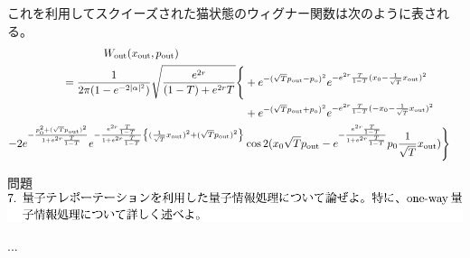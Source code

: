 \documentclass{jsarticle}
\newcommand{\mr}[1]{\mathrm{#1}}
\begin{document}
これを利用してスクイーズされた猫状態のウィグナー関数は次のように表される。
\begin{align*}
	W_\mr{out}(x_\mr{out}, p_\mr{out}) \qquad \qquad \qquad \\
	= \frac{1}{2\pi (1-e^{-2|\alpha|^2})} \sqrt{\frac{e^{2r}}{(1-T) + e^{2r}T}} \Biggl\{
	&+ e^{-(\sqrt{T} p_\mr{out} - p_\mr{o})^2 } e^{-e^{2r} \frac{T}{1-T} (x_0-\frac{1}{\sqrt{T}} x_\mr{out})^2} \\
	&+ e^{-(\sqrt{T} p_\mr{out} + p_\mr{o})^2 } e^{-e^{2r} \frac{T}{1-T} (-x_0-\frac{1}{\sqrt{T}} x_\mr{out})^2} \\
	- 2e^{-\frac{p_0^2 + (\sqrt{T} p_\mr{out})^2}{1+e^{2r}\frac{T}{1-T}}}  e^{-\frac{e^{2r}\frac{T}{1-T}}{1 + e^{2r}\frac{T}{1-T}}  \qty{(\frac{1}{\sqrt{T}}x_\mr{out})^2 + (\sqrt{T} p_\mr{out})^2} } &  \cos{ 2(x_0 \sqrt{T} p_\mr{out} -   e^{-\frac{e^{2r}\frac{T}{1-T}}{1 + e^{2r}\frac{T}{1-T}}}     p_0 \frac{1}{\sqrt{T}} x_\mr{out}    ) } \Biggr\}
\end{align*}


\begin{itembox}[l]{問題}
	\vspace*{-0mm}
	\centering
	\includegraphics[width=1\linewidth]{./graphics/7.pdf}
\end{itembox}

...



\end{document}
